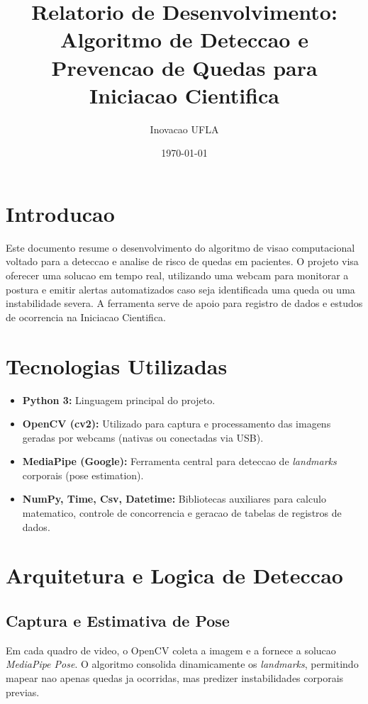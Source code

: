 \documentclass[12pt,a4paper]{article}
\title{Relatorio de Desenvolvimento: Algoritmo de Deteccao e Prevencao de Quedas para Iniciacao Cientifica}
\author{Inovacao UFLA}
\date{\today}
\begin{document}
\maketitle

\section{Introducao}
Este documento resume o desenvolvimento do algoritmo de visao computacional voltado para a deteccao e analise de risco de quedas em pacientes. O projeto visa oferecer uma solucao em tempo real, utilizando uma webcam para monitorar a postura e emitir alertas automatizados caso seja identificada uma queda ou uma instabilidade severa. A ferramenta serve de apoio para registro de dados e estudos de ocorrencia na Iniciacao Cientifica.

\section{Tecnologias Utilizadas}
\begin{itemize}
    \item \textbf{Python 3:} Linguagem principal do projeto.
    \item \textbf{OpenCV (cv2):} Utilizado para captura e processamento das imagens geradas por webcams (nativas ou conectadas via USB).
    \item \textbf{MediaPipe (Google):} Ferramenta central para deteccao de \textit{landmarks} corporais (pose estimation).
    \item \textbf{NumPy, Time, Csv, Datetime:} Bibliotecas auxiliares para calculo matematico, controle de concorrencia e geracao de tabelas de registros de dados.
\end{itemize}

\section{Arquitetura e Logica de Deteccao}
\subsection{Captura e Estimativa de Pose}
Em cada quadro de video, o OpenCV coleta a imagem e a fornece a solucao \textit{MediaPipe Pose}. O algoritmo consolida dinamicamente os \textit{landmarks}, permitindo mapear nao apenas quedas ja ocorridas, mas predizer instabilidades corporais previas.
\end{document}
